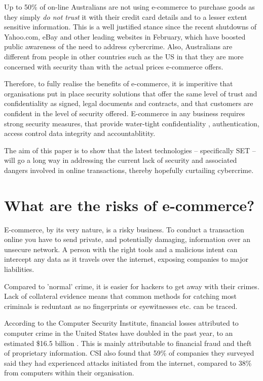 \documentclass[11pt,a4paper,twoside,notitlepage]{article}
\begin{document}
Up to 50\% of on-line Australians are not using e-commerce to purchase goods as they simply 
\textit{do not trust} it with their credit card details and to a lesser extent sensitive information\cite{anon:ABF00}.  This is a well justified stance since the
recent shutdowns of Yahoo.com, eBay and other leading websites in February, which have boosted public
awareness of the need to address cybercrime. Also,  Australians are different from people in other countries such as the US in that
they are more concerned with security than with the actual prices e-commerce
offers\cite{anon:ABF00}.



Therefore, to fully realise the benefits of e-commerce, it is imperitive that organisations put in place
security solutions that offer the same level of trust and confidentiality as signed, legal documents and 
contracts, and that customers are confident in the level of security offered.  E-commerce in any business
requires strong security measures, that provide water-tight confidentiality , authentication, access control
data integrity and accountablitity.

The aim of this paper is to show that the latest technologies -- specifically SET
-- will go a long way in addressing the current lack of security and associated dangers involved
in online transactions, 
thereby hopefully curtailing cybercrime.

\section*{What are the risks of e-commerce?}

 E-commerce, by its very nature, is a risky business.  To conduct a transaction online
 you have to send private, and potentially damaging, information over an unsecure
 network.  A person with the right tools and a malicious intent can intercept any
 data as it travels over the internet, exposing companies to major liabilities.  

 Compared to 'normal' crime, it is easier for hackers to get away with their crimes.
 Lack of collateral evidence means that common methods for catching most criminals is 
 reduntant as no fingerprints or eyewitnesses etc. can be traced\cite{Phillips:Age99}.

 According to the Computer Security Institute, financial losses attributed to computer
 crime in the United States have doubled in the past year, to an estimated
 \$16.5 billion \cite{anonLA:Age00}.  This is mainly attributable to financial
 fraud and theft of proprietary information.  CSI also found that 59\% of companies
 they surveyed said they had experienced attacks initiated from the internet, compared
 to 38\% from computers within their organisation\cite{anonLA:Age00}.
 
\end{document}
